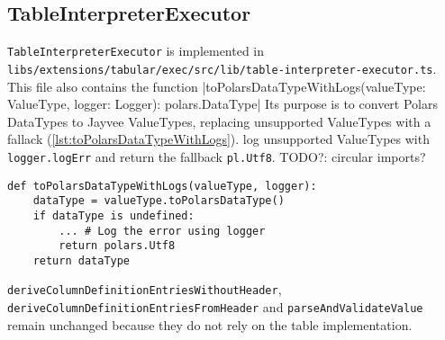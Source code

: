 \subsection{TableInterpreterExecutor} %
\label{section:tableinterpreterexecutor}

\Verb|TableInterpreterExecutor| is implemented in \Verb|libs/extensions/tabular/exec/src/lib/table-interpreter-executor.ts|.
This file also contains the function
|toPolarsDataTypeWithLogs(valueType: ValueType, logger: Logger): polars.DataType|
Its purpose is to convert Polars DataTypes to Jayvee ValueTypes, replacing unsupported ValueTypes with a fallack (\ref{lst:toPolarsDataTypeWithLogs}).
log unsupported ValueTypes with \Verb|logger.logErr| and return the fallback \Verb|pl.Utf8|.
TODO?: circular imports?

\begin{listing}
	\begin{verbatim}
def toPolarsDataTypeWithLogs(valueType, logger):
	dataType = valueType.toPolarsDataType()
	if dataType is undefined:
		... # Log the error using logger
		return polars.Utf8
	return dataType
	\end{verbatim}
	\caption{Pseudocode of the \Verb|toPolarsDataTypeFunction|}
	\label{lst:toPolarsDataTypeWithLogs}
\end{listing}


\Verb|deriveColumnDefinitionEntriesWithoutHeader|, \Verb|deriveColumnDefinitionEntriesFromHeader| and \Verb|parseAndValidateValue| remain unchanged because they do not rely on the table implementation.

%

